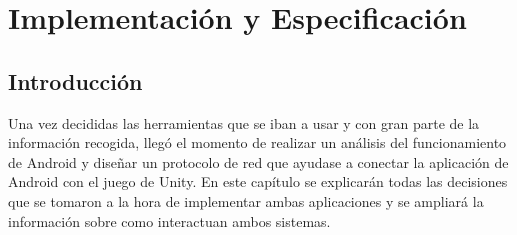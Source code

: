 %
%
%
%
%
%
%
%
%
%

\chapter{Implementaci\'on y Especificaci\'on}
\label{cap4}
\label{cap:implentacion-especificacion}


\begin{FraseCelebre}
\begin{Frase}
\end{Frase}
\begin{Fuente}
\end{Fuente}
\end{FraseCelebre}

\section{Introducci\'on}
\label{cap4:sec:intro}

Una vez decididas las herramientas que se iban a usar y con gran parte de la informaci\'on recogida, lleg\'o el momento de realizar un an\'alisis del funcionamiento de Android y dise\~nar un protocolo de red que ayudase a conectar la aplicaci\'on de Android con el juego de Unity. En este cap\'itulo se explicar\'an todas las decisiones que se tomaron a la hora de implementar ambas aplicaciones y se ampliar\'a la informaci\'on sobre como interactuan ambos sistemas.

